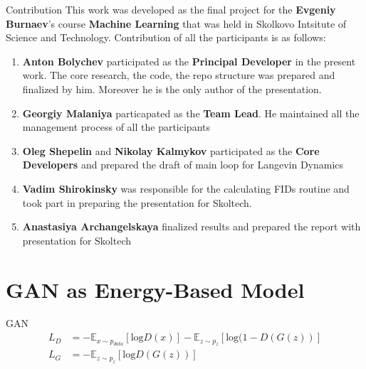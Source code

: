 \documentclass[xcolor=dvipsnames]{beamer}
\begin{document}
    \begin{frame}
        \titlepage
    \end{frame}
    \begin{frame}{Contribution}
        This work was developed as the final project for the \textbf{Evgeniy Burnaev}'s course  
        \textbf{Machine Learning} that was held in Skolkovo Intsitute of Science and Technology.
        Contribution of all the participants is as follows:
        \begin{enumerate}
            \item \textbf{Anton Bolychev} participated as the \textbf{Principal Developer} in the present work. The core
            research, the code, the repo structure was prepared and finalized by him. Moreover he is the only 
            author of the presentation.
            \item \textbf{Georgiy Malaniya} particapated as the \textbf{Team Lead}. He maintained all the management
            process of all the participants
            \item \textbf{Oleg Shepelin} and \textbf{Nikolay Kalmykov} participated as 
            the \textbf{Core Developers} and prepared the draft of main loop for Langevin Dynamics
            \item \textbf{Vadim Shirokinsky} was responsible for the calculating FIDs routine and took part in preparing
            the presentation for Skoltech.
            \item \textbf{Anastasiya Archangelskaya} finalized results and prepared the report with presentation for
            Skoltech
        \end{enumerate}
    \end{frame}
    \section{GAN as Energy-Based Model} 
    \begin{frame}{GAN}
        \begin{align*}
            L_D &= -\mathbb{E}_{x \sim p_{data}} [ \text{log} D(x)] - \mathbb{E}_{z \sim p_z} [\text{log}(1 - D(G(z))] \\    
            L_G &= -\mathbb{E}_{z \sim p_z} [\text{log} D(G(z))]
        \end{align*}
    \end{frame}
    
\end{document}
